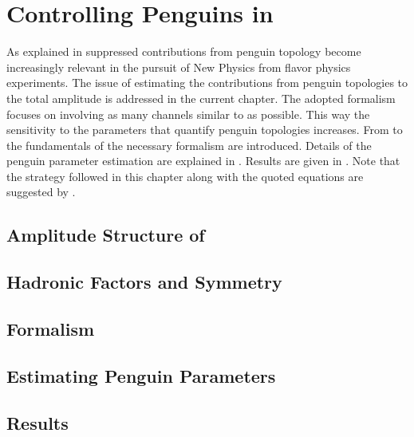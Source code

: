 
\chapter{Controlling Penguins in \phis}
\label{Penguins}

As explained in  suppressed contributions from penguin topology become
increasingly relevant in the pursuit of New Physics from flavor physics experiments.
The issue of estimating the contributions from
penguin topologies to the total \BsJpsiPhi amplitude is addressed in the current chapter.
The adopted formalism focuses on involving as many channels similar to \BsJpsiPhi as possible.
This way the sensitivity to the parameters that quantify penguin topologies increases.
From  to  the fundamentals of
the necessary formalism are introduced. Details of the penguin parameter estimation are
explained in . Results are given in .
Note that the strategy followed in this chapter along with the quoted equations are
suggested by \cite{Fleischer:1999zi,Faller:2008gt,DeBruyn:2014oga}.

\section{Amplitude Structure of \BsJpsiPhi}
\label{jpsiphi_amp_struct}


\section{Hadronic Factors and \grpsuthree Symmetry}
\label{had_pars_suthree}


\section{Formalism}
\label{penguin_formalism}


\section{Estimating Penguin Parameters}
\label{penguin_more_chanells}


\section{Results}
\label{penguin_results}

